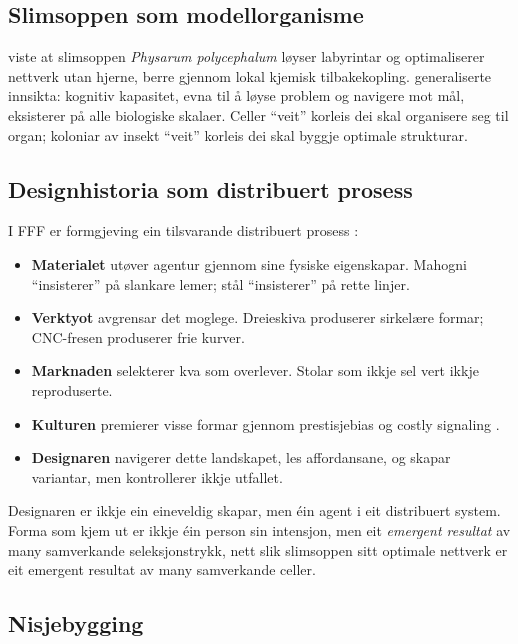 \documentclass[12pt,a4paper]{article}
\begin{document}
\subsection{Slimsoppen som modellorganisme}

\citet{nakagaki2000} viste at slimsoppen \emph{Physarum polycephalum} l\o{}yser labyrintar og optimaliserer nettverk utan hjerne, berre gjennom lokal kjemisk tilbakekopling. \citet{levin2019} generaliserte innsikta: kognitiv kapasitet, evna til \aa{} l\o{}yse problem og navigere mot m\aa{}l, eksisterer p\aa{} alle biologiske skalaer. Celler \enquote{veit} korleis dei skal organisere seg til organ; koloniar av insekt \enquote{veit} korleis dei skal byggje optimale strukturar.

\subsection{Designhistoria som distribuert prosess}

I FFF er formgjeving ein tilsvarande distribuert prosess \citep{hutchins1995, clark2008}:

\begin{itemize}[nosep]
    \item \textbf{Materialet} ut\o{}ver agentur gjennom sine fysiske eigenskapar. Mahogni \enquote{insisterer} p\aa{} slankare lemer; st\aa{}l \enquote{insisterer} p\aa{} rette linjer.
    \item \textbf{Verktyot} avgrensar det moglege. Dreieskiva produserer sirkel\ae{}re formar; CNC-fresen produserer frie kurver.
    \item \textbf{Marknaden} selekterer kva som overlever. Stolar som ikkje sel vert ikkje reproduserte.
    \item \textbf{Kulturen} premierer visse formar gjennom prestisje\-bias \citep{henrich2016} og costly signaling \citep{zahavi1975}.
    \item \textbf{Designaren} navigerer dette landskapet, les affordansane, og skapar variantar, men kontrollerer ikkje utfallet.
\end{itemize}

\noindent
Designaren er ikkje ein eineveldig skapar, men \'{e}in agent i eit distribuert system. Forma som kjem ut er ikkje \'{e}in person sin intensjon, men eit \emph{emergent resultat} av many samverkande seleksjonstrykk, nett slik slimsoppen sitt optimale nettverk er eit emergent resultat av many samverkande celler.

\subsection{Nisjebygging}
\end{document}
